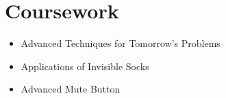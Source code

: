 \section{Coursework}
  \vspace{-10pt} %
  \begin{multicols}{3}
    \begin{itemize}[label=\textbf{$\bullet$}]
      \setlength{\itemsep}{-0.5em} %
      \setlength{\itemindent}{-0.5em} %
      \item{Advanced Techniques for Tomorrow's Problems}
      \item{Applications of Invisible Socks}
      \item{Advanced Mute Button}
    \end{itemize}
  \end{multicols}
